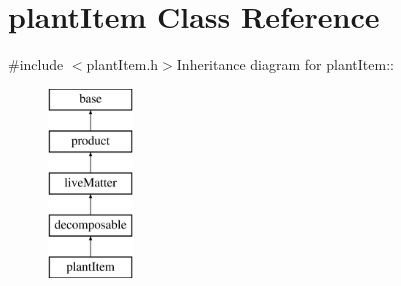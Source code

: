 \hypertarget{classplant_item}{
\section{plantItem Class Reference}
\label{classplant_item}
}


{\ttfamily \#include $<$plantItem.h$>$}Inheritance diagram for plantItem::\begin{figure}[H]
\begin{center}
\leavevmode
\includegraphics[height=5cm]{classplant_item}
\end{center}
\end{figure}
